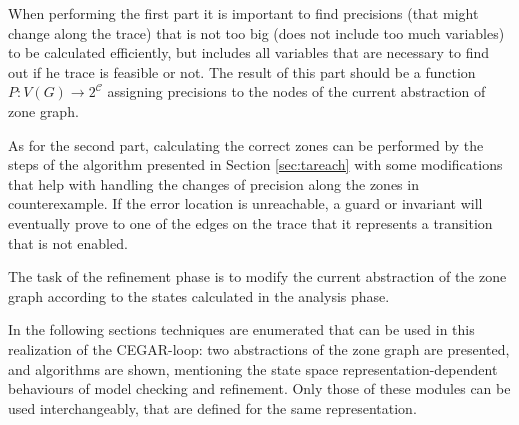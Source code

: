 When performing the first part it is important to find precisions (that might change along the trace) that is not too big (does not include too much variables) to be calculated efficiently, but includes all variables that are necessary to find out if he trace is feasible or not. The result of this part should be a function $P: V(G) \to 2^\mathcal{C}$ assigning precisions to the nodes of the current abstraction of zone graph.

As for the second part, calculating the correct zones can be performed by the steps of the algorithm presented in Section \ref{sec:tareach} with some modifications that help with handling the changes of precision along the zones in counterexample. If the error location is unreachable, a guard or invariant will eventually prove to one of the edges on the trace that it represents a transition that is not enabled.

The task of the refinement phase is to modify the current abstraction of the zone graph according to the states calculated in the analysis phase.


In the following sections techniques are enumerated that can be used in this realization of the CEGAR-loop: two abstractions of the zone graph are presented, and algorithms are shown, mentioning the state space representation-dependent behaviours of model checking and refinement. Only those of these modules can be used interchangeably, that are defined for the same representation.






